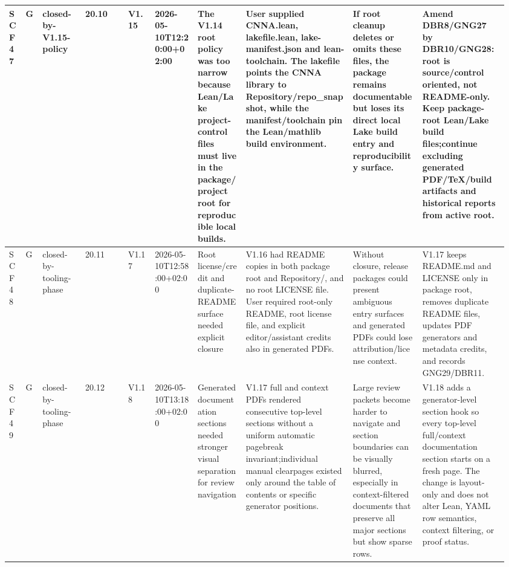 \begin{longtable}{L{0.03\linewidth} L{0.026\linewidth} L{0.087\linewidth} L{0.085\linewidth} L{0.052\linewidth} L{0.085\linewidth} L{0.095\linewidth} L{0.205\linewidth} L{0.13\linewidth} L{0.165\linewidth}}
SCF47 & G & closed-by-V1.15-policy & 20.10 & V1.15 & 2026-05-10T12:20:00+02:00 & The V1.14 root policy was too narrow because Lean/\allowbreak{}Lake project-control files must live in the package/\allowbreak{}project root for reproducible local builds. & User supplied CNNA.lean, lakefile.lean, lake-manifest.json and lean-toolchain. The lakefile points the CNNA library to Repository/\allowbreak{}repo\_snapshot, while the manifest/\allowbreak{}toolchain pin the Lean/\allowbreak{}mathlib build environment. & If root cleanup deletes or omits these files, the package remains documentable but loses its direct local Lake build entry and reproducibility surface. & Amend DBR8/\allowbreak{}GNG27 by DBR10/\allowbreak{}GNG28: root is source/\allowbreak{}control oriented, not README-only. Keep package-root Lean/\allowbreak{}Lake build files;\newline continue excluding generated PDF/\allowbreak{}TeX/\allowbreak{}build artifacts and historical reports from active root.\\
\hline
\addlinespace[0.24em]
SCF48 & G & closed-by-tooling-phase & 20.11 & V1.17 & 2026-05-10T12:58:00+02:00 & Root license/\allowbreak{}credit and duplicate-README surface needed explicit closure & V1.16 had README copies in both package root and Repository/\allowbreak{}, and no root LICENSE file. User required root-only README, root license file, and explicit editor/\allowbreak{}assistant credits also in generated PDFs. & Without closure, release packages could present ambiguous entry surfaces and generated PDFs could lose attribution/\allowbreak{}license context. & V1.17 keeps README.md and LICENSE only in package root, removes duplicate README files, updates PDF generators and metadata credits, and records GNG29/\allowbreak{}DBR11.\\
\hline
\addlinespace[0.24em]
SCF49 & G & closed-by-tooling-phase & 20.12 & V1.18 & 2026-05-10T13:18:00+02:00 & Generated documentation sections needed stronger visual separation for review navigation & V1.17 full and context PDFs rendered consecutive top-level sections without a uniform automatic pagebreak invariant;\newline individual manual clearpages existed only around the table of contents or specific generator positions. & Large review packets become harder to navigate and section boundaries can be visually blurred, especially in context-filtered documents that preserve all major sections but show sparse rows. & V1.18 adds a generator-level section hook so every top-level full/\allowbreak{}context documentation section starts on a fresh page. The change is layout-only and does not alter Lean, YAML row semantics, context filtering, or proof status.\\

\end{longtable}
